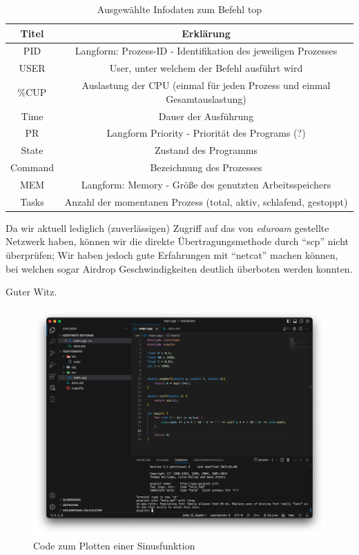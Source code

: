 \documentclass{scrartcl}
\begin{document}
    \subaufgabe
        \begin{table}[H]
            \centering
            \begin{tabular}{c|c}
                 Titel & Erklärung  \\
                 \hline
                 PID & Langform: Prozess-ID - Identifikation des jeweiligen Prozesses\\
                 USER & User, unter welchem der Befehl ausführt wird\\
                 \%CUP & Auslastung der CPU (einmal für jeden Prozess und einmal Gesamtauslastung)\\
                 Time & Dauer der Ausführung\\
                 PR & Langform Priority - Priorität des Programs (?)\\
                 State & Zustand des Programms\\
                 Command & Bezeichnung des Prozesses\\
                 MEM & Langform: Memory - Größe des genutzten Arbeitsspeichers\\
                 Tasks & Anzahl der momentanen Prozess (total, aktiv, schlafend, gestoppt)
            \end{tabular}
            \caption{Ausgewählte Infodaten zum Befehl top}
            \label{tab:my_label}
        \end{table}

    \subaufgabe{}
        Da wir aktuell lediglich (zuverlässigen) Zugriff auf das von \emph{eduroam} gestellte Netzwerk haben, können wir die direkte Übertragungsmethode durch \enquote{scp} nicht überprüfen; Wir haben jedoch gute Erfahrungen mit \enquote{netcat} machen können, bei welchen sogar Airdrop Geschwindigkeiten deutlich überboten werden konnten. 
        
    \subaufgabe{}
        Guter Witz.
        
    \subaufgabe{}
        \begin{figure}[H]
            \centering
            \includegraphics[width=\textwidth]{Bilder/Bildschirmfoto 2023-04-26 um 22.51.54.png}
            \caption{Code zum Plotten einer Sinusfunktion}
            \label{fig:gnuplotSinefunction}
        \end{figure}
\end{document}
